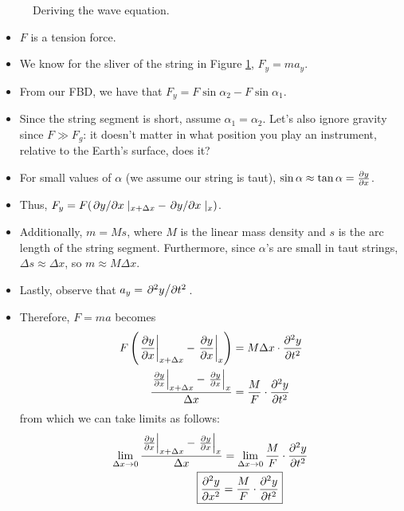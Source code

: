 \documentclass[../notes.tex]{subfiles}
\begin{document}
\begin{itemize}
\begin{figure}[h!]
        \caption{Deriving the wave equation.}
        \label{fig:waveEquationDerivation}
    \end{figure}
    \begin{itemize}
        \item $F$ is a tension force.
        \item We know for the sliver of the string in Figure \ref{fig:waveEquationDerivation}, $F_y=ma_y$.
        \item From our FBD, we have that $F_y=F\sin\alpha_2-F\sin\alpha_1$.
        \item Since the string segment is short, assume $\alpha_1=\alpha_2$. Let's also ignore gravity since $F\gg F_g$: it doesn't matter in what position you play an instrument, relative to the Earth's surface, does it?
        \item For small values of $\alpha$ (we assume our string is taut), $\sin\alpha\approx\tan\alpha=\pdv{y}{x}$.
        \item Thus, $F_y=F(\pdv*{y}{x}|_{x+\Delta x}-\pdv*{y}{x}|_{x})$.
        \item Additionally, $m=Ms$, where $M$ is the linear mass density and $s$ is the arc length of the string segment. Furthermore, since $\alpha$'s are small in taut strings, $\Delta s\approx\Delta x$, so $m\approx M\Delta x$.
        \item Lastly, observe that $a_y=\pdv*[2]{y}{t}$.
        \item Therefore, $F=ma$ becomes
        \begin{align*}
            F\left( \eval{\pdv{y}{x}}_{x+\Delta x}-\eval{\pdv{y}{x}}_x \right) &= M\Delta x\cdot\pdv[2]{y}{t}\\
            \frac{\eval{\pdv{y}{x}}_{x+\Delta x}-\eval{\pdv{y}{x}}_x}{\Delta x} &= \frac{M}{F}\cdot\pdv[2]{y}{t}
        \end{align*}
        from which we can take limits as follows:
        \begin{align*}
            \lim_{\Delta x\to 0}\frac{\eval{\pdv{y}{x}}_{x+\Delta x}-\eval{\pdv{y}{x}}_x}{\Delta x} &= \lim_{\Delta x\to 0}\frac{M}{F}\cdot\pdv[2]{y}{t}\\
            \Aboxed{\pdv[2]{y}{x} &= \frac{M}{F}\cdot\pdv[2]{y}{t}}
        \end{align*}
    \end{itemize}

\end{itemize}
\end{document}
